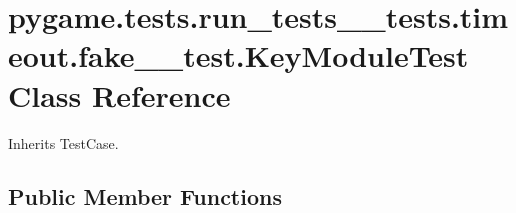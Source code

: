 \hypertarget{classpygame_1_1tests_1_1run__tests____tests_1_1timeout_1_1fake__2__test_1_1_key_module_test}{}\section{pygame.\+tests.\+run\+\_\+tests\+\_\+\+\_\+tests.\+timeout.\+fake\+\_\+\_\+test.\+Key\+Module\+Test Class Reference}
\label{classpygame_1_1tests_1_1run__tests____tests_1_1timeout_1_1fake__2__test_1_1_key_module_test}


Inherits Test\+Case.

\subsection*{Public Member Functions}
